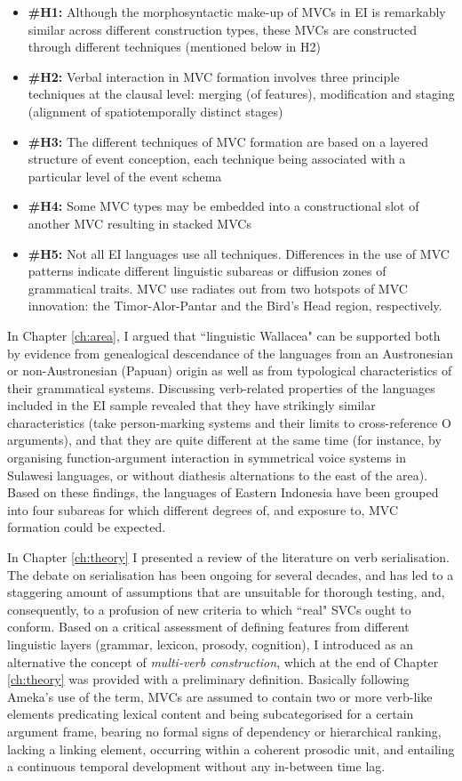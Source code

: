 \begin{itemize}
\item \textbf{\#H1:} Although the morphosyntactic make-up of MVCs in EI is remarkably similar across different construction types, these MVCs are constructed through different techniques (mentioned below in H2)
\item \textbf{\#H2:} Verbal interaction in MVC formation involves three principle techniques at the clausal level: merging (of features), modification and staging (alignment of spatiotemporally distinct stages)
\item \textbf{\#H3:} The different techniques of MVC formation are based on a layered structure of event conception, each technique being associated with a particular level of the event schema
\item \textbf{\#H4:} Some MVC types may be embedded into a constructional slot of another MVC resulting in stacked MVCs
\item \textbf{\#H5:} Not all EI languages use all techniques. Differences in the use of MVC patterns indicate different linguistic subareas or diffusion zones of grammatical traits. MVC use radiates out from two hotspots of MVC innovation: the Timor-Alor-Pantar and the Bird's Head region, respectively.
\end{itemize}

In Chapter \ref{ch:area}, I argued that ``linguistic Wallacea" can be supported both by evidence from genealogical descendance of the languages from an Austronesian or non-Austronesian (Papuan) origin as well as from typological characteristics of their grammatical systems. Discussing verb-related properties of the languages included in the EI sample revealed that they have strikingly similar characteristics (take person-marking systems and their limits to cross-reference O arguments), and that they are quite different at the same time (for instance, by organising function-argument interaction in symmetrical voice systems in Sulawesi languages, or without diathesis alternations to the east of the area). Based on these findings, the languages of Eastern Indonesia have been grouped into four subareas for which different degrees of, and exposure to, MVC formation could be expected. 

In Chapter \ref{ch:theory} I presented a review of the literature on verb serialisation. The debate on serialisation has been ongoing for several decades, and has led to a staggering amount of assumptions that are unsuitable for thorough testing, and, consequently, to a profusion of new criteria to which ``real" SVCs ought to conform. Based on a critical assessment of defining features from different linguistic layers (grammar, lexicon, prosody, cognition), I introduced as an alternative the concept of \textit{multi-verb construction}, which at the end of Chapter \ref{ch:theory} was provided with a preliminary definition. Basically following Ameka's use of the term, MVCs are assumed to contain two or more verb-like elements predicating lexical content and being subcategorised for a certain argument frame, bearing no formal signs of dependency or hierarchical ranking, lacking a linking element, occurring within a coherent prosodic unit, and entailing a continuous temporal development without any in-between time lag. 

